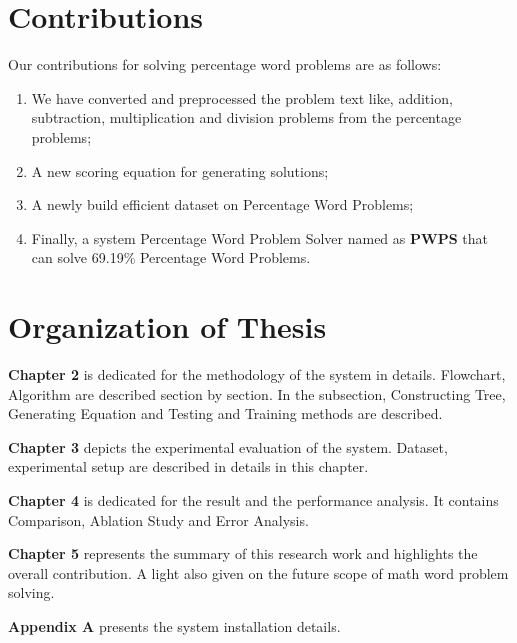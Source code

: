 \documentclass[document.tex]{subfiles}
\begin{document}
\section{Contributions}
\noindent Our contributions for solving percentage word problems are as follows: 
\begin{enumerate}
	\item We have converted and preprocessed the problem text like, addition, subtraction, multiplication and division problems from the percentage problems; 
	\item A new scoring equation for generating solutions;
	\item A newly build efficient dataset on Percentage Word Problems; 
	\item Finally, a system Percentage Word Problem Solver named as \textbf{PWPS} that can solve 69.19\% Percentage Word Problems.
\end{enumerate}

\section{Organization of Thesis}
\noindent \textbf{Chapter 2} is dedicated for the methodology of the system in details. Flowchart, Algorithm are described section by section. In the subsection, Constructing Tree, Generating Equation and Testing and Training methods are described.

\noindent \textbf{Chapter 3} depicts the experimental evaluation of the system. Dataset, experimental setup are described in details in this chapter.


\noindent \textbf{Chapter 4} is dedicated for the result and the performance analysis. It contains Comparison, Ablation Study and Error Analysis.


\noindent \textbf{Chapter 5} represents the summary of this research work and highlights the overall contribution. A light also given on the future scope of math word problem solving.


\noindent \textbf{Appendix A} presents the system installation details.
\end{document}
